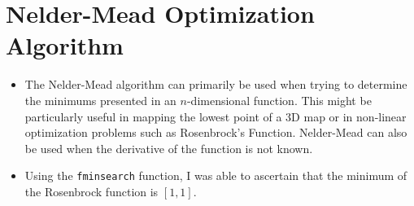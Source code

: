 \documentclass[12pt]{extarticle}
\begin{document}
\section{Nelder-Mead Optimization Algorithm}
\begin{itemize}
\item The Nelder-Mead algorithm can primarily be used when trying to determine the minimums presented in an $n$-dimensional function. This might be particularly useful in mapping the lowest point of a 3D map or in non-linear optimization problems such as Rosenbrock's Function. Nelder-Mead can also be used when the derivative of the function is not known.

\item Using the \verb|fminsearch| function, I was able to ascertain that the minimum of the Rosenbrock function is $[1,1]$.
\end{itemize}
\end{document}
